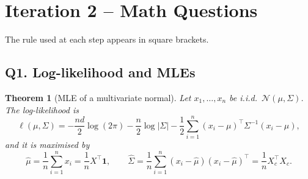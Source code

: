 \documentclass[11pt]{article}
\newtheorem{theorem}{Theorem}[section]
\theoremstyle{definition}
\newcommand{\T}{^{\top}}
\begin{document}
\section{Iteration 2 -- Math Questions}
The rule used at each step appears in square brackets.

\subsection*{Q1. Log-likelihood and MLEs}
\begin{theorem}[MLE of a multivariate normal]\label{thm:mle}
Let $x_1,\dots,x_n$ be i.i.d.\ $\mathcal N(\mu,\Sigma)$. The log-likelihood is
\[
\ell(\mu,\Sigma)=-\frac{nd}{2}\log(2\pi)-\frac n2\log|\Sigma|-\frac12\sum_{i=1}^n(x_i-\mu)\T\Sigma^{-1}(x_i-\mu),
\]
and it is maximised by
\[
\hat\mu=\frac1n\sum_{i=1}^n x_i=\frac1n X\T\mathbf 1,\qquad
\hat\Sigma=\frac1n\sum_{i=1}^n(x_i-\hat\mu)(x_i-\hat\mu)\T=\frac1n X_c\T X_c .
\]
\end{theorem}
\end{document}
